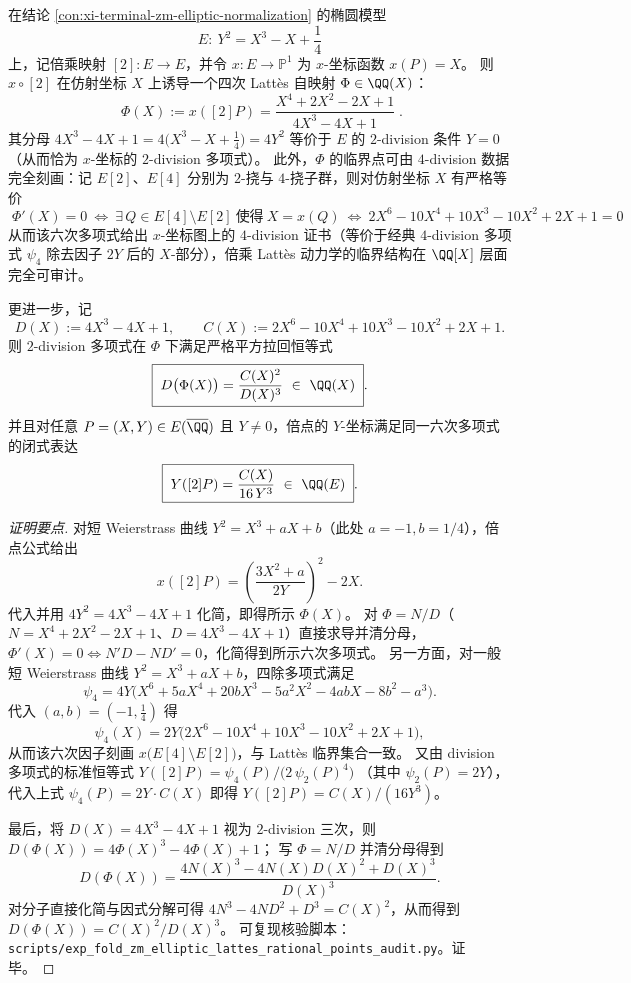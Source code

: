 \begin{conclusion}\label{con:xi-terminal-zm-elliptic-lattes-doubling}\label{con:xi-terminal-zm-lattes-4division-certificate}
在结论 \ref{con:xi-terminal-zm-elliptic-normalization} 的椭圆模型
\[
E:\ Y^2=X^3-X+\frac14
\]
上，记倍乘映射 \([2]:E\to E\)，并令 \(x:E\to\mathbb P^1\) 为 \(x\)-坐标函数 \(x(P)=X\)。
则 \(x\circ[2]\) 在仿射坐标 \(X\) 上诱导一个四次 Latt\`es 自映射 \(\Phi\in\QQ(X)\)：
\[
\boxed{\;
\Phi(X):=x([2]P)=\frac{X^4+2X^2-2X+1}{4X^3-4X+1}\; }.
\]
其分母
\(
4X^3-4X+1
=4\bigl(X^3-X+\tfrac14\bigr)
=4Y^2
\)
等价于 \(E\) 的 \(2\)-division 条件 \(Y=0\)（从而恰为 \(x\)-坐标的 \(2\)-division 多项式）。
此外，\(\Phi\) 的临界点可由 \(4\)-division 数据完全刻画：记 \(E[2]\)、\(E[4]\) 分别为 \(2\)-挠与 \(4\)-挠子群，则对仿射坐标 \(X\) 有严格等价
\[
\boxed{\;
\Phi'(X)=0
\ \Longleftrightarrow\
\exists\,Q\in E[4]\setminus E[2]\ \text{使得}\ X=x(Q)
\ \Longleftrightarrow\
2X^{6}-10X^{4}+10X^{3}-10X^{2}+2X+1=0\; }.
\]
从而该六次多项式给出 \(x\)-坐标图上的 \(4\)-division 证书（等价于经典 \(4\)-division 多项式 \(\psi_4\) 除去因子 \(2Y\) 后的 \(X\)-部分），倍乘 Latt\`es 动力学的临界结构在 \(\QQ[X]\) 层面完全可审计。
\par
更进一步，记
\[
D(X):=4X^{3}-4X+1,\qquad
C(X):=2X^{6}-10X^{4}+10X^{3}-10X^{2}+2X+1.
\]
则 \(2\)-division 多项式在 \(\Phi\) 下满足严格平方拉回恒等式
\[
\boxed{\;
D\bigl(\Phi(X)\bigr)=\frac{C(X)^{2}}{D(X)^{3}}\ \in\ \QQ(X)\; }.
\]
并且对任意 \(P=(X,Y)\in E(\overline{\QQ})\) 且 \(Y\neq 0\)，倍点的 \(Y\)-坐标满足同一六次多项式的闭式表达
\[
\boxed{\;
Y([2]P)=\frac{C(X)}{16\,Y^{3}}\ \in\ \QQ(E)\; }.
\]
\end{conclusion}
\begin{proof}[证明要点]
对短 Weierstrass 曲线 \(Y^2=X^3+aX+b\)（此处 \(a=-1,b=1/4\)），倍点公式给出
\[
x([2]P)=\left(\frac{3X^2+a}{2Y}\right)^{\!2}-2X.
\]
代入并用 \(4Y^2=4X^3-4X+1\) 化简，即得所示 \(\Phi(X)\)。
对 \(\Phi=N/D\)（\(N=X^4+2X^2-2X+1\)、\(D=4X^3-4X+1\)）直接求导并清分母，
\(
\Phi'(X)=0\iff N'D-ND'=0
\)，化简得到所示六次多项式。
另一方面，对一般短 Weierstrass 曲线 \(Y^2=X^3+aX+b\)，四除多项式满足
\[
\psi_4=4Y\bigl(X^6+5aX^4+20bX^3-5a^2X^2-4abX-8b^2-a^3\bigr).
\]
代入 \((a,b)=(-1,\tfrac14)\) 得
\[
\psi_4(X)=2Y\bigl(2X^{6}-10X^{4}+10X^{3}-10X^{2}+2X+1\bigr),
\]
从而该六次因子刻画 \(x\bigl(E[4]\setminus E[2]\bigr)\)，与 Latt\`es 临界集合一致。
又由 division 多项式的标准恒等式
\(
Y([2]P)=\psi_4(P)\big/ \bigl(2\,\psi_2(P)^{4}\bigr)
\)
（其中 \(\psi_2(P)=2Y\)），代入上式 \(\psi_4(P)=2Y\cdot C(X)\) 即得
\(
Y([2]P)=C(X)/(16Y^{3})
\)。
\par
最后，将 \(D(X)=4X^{3}-4X+1\) 视为 \(2\)-division 三次，则
\(
D(\Phi(X))=4\Phi(X)^{3}-4\Phi(X)+1
\)；
写 \(\Phi=N/D\) 并清分母得到
\[
D(\Phi(X))=\frac{4N(X)^{3}-4N(X)D(X)^{2}+D(X)^{3}}{D(X)^{3}}.
\]
对分子直接化简与因式分解可得
\(
4N^{3}-4ND^{2}+D^{3}=C(X)^{2}
\)，从而得到 \(D(\Phi(X))=C(X)^{2}/D(X)^{3}\)。
可复现核验脚本：\texttt{scripts/exp\_fold\_zm\_elliptic\_lattes\_rational\_points\_audit.py}。证毕。
\end{proof}

